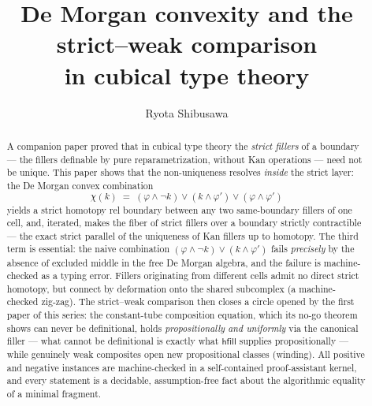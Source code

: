 \documentclass[11pt]{amsart}
\theoremstyle{definition}
\newcommand{\hfillop}{\mathsf{hfill}}
\begin{document}
\title[De Morgan convexity]{De Morgan convexity and the
  strict--weak comparison\\ in cubical type theory}

\author{Ryota Shibusawa}
\address{Daiichi Institute of Technology, Japan}


\begin{abstract}
  A companion paper proved that in cubical type theory the
  \emph{strict fillers} of a boundary --- the fillers definable by
  pure reparametrization, without Kan operations --- need not be
  unique.  This paper shows that the non-uniqueness resolves
  \emph{inside} the strict layer: the De Morgan convex combination
  \[
    \chi(k) \;=\; (\varphi \wedge \neg k) \vee (k \wedge \varphi')
    \vee (\varphi \wedge \varphi')
  \]
  yields a strict homotopy rel boundary between any two
  same-boundary fillers of one cell, and, iterated, makes the fiber
  of strict fillers over a boundary strictly contractible --- the
  exact strict parallel of the uniqueness of Kan fillers up to
  homotopy.  The third term is essential: the naive combination
  $(\varphi \wedge \neg k) \vee (k \wedge \varphi')$ fails
  \emph{precisely} by the absence of excluded middle in the free De
  Morgan algebra, and the failure is machine-checked as a typing
  error.  Fillers originating from different cells admit no direct
  strict homotopy, but connect by deformation onto the shared
  subcomplex (a machine-checked zig-zag).  The strict--weak
  comparison then closes a circle opened by the first paper of this
  series: the constant-tube composition equation, which its no-go
  theorem shows can never be definitional, holds
  \emph{propositionally and uniformly} via the canonical filler ---
  what cannot be definitional is exactly what $\hfillop$ supplies
  propositionally --- while genuinely weak composites open new
  propositional classes (winding).  All positive and negative
  instances are machine-checked in a self-contained proof-assistant
  kernel, and every statement is a decidable, assumption-free fact
  about the algorithmic equality of a minimal fragment.
\end{abstract}

\maketitle
\end{document}

